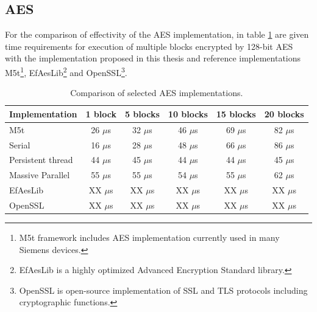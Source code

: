 \subsection*{AES}
For the comparison of effectivity of the AES implementation, in table 
\ref{aes-comparison} are given time requirements for execution of multiple
blocks encrypted by 128-bit AES with the implementation proposed in this thesis
and reference implementations M5t\footnote{ M5t framework includes AES 
implementation currently used in many Siemens devices\cite{m5t}.}, 
EfAesLib\footnote{ EfAesLib is a highly optimized Advanced Encryption Standard 
library\cite{aes-lib}.} and OpenSSL\footnote{ OpenSSL is open-source 
implementation of SSL and TLS protocols including cryptographic 
functions\cite{openssl}.}.
\begin{table}[H]
\begin{center}
\begin{tabular}{|l|ccccc|}\hline%
Implementation &  1 block & 5 blocks & 10 blocks & 15 blocks & 20 blocks\\\hline
M5t  &26 $\mu$s&32 $\mu$s&46 $\mu$s&69 $\mu$s&82 $\mu$s\\ 
Serial  &16 $\mu$s&28 $\mu$s&48 $\mu$s&66 $\mu$s&86 $\mu$s\\
Persistent thread&44 $\mu$s&45 $\mu$s&44 $\mu$s&44 $\mu$s&45 $\mu$s\\
Massive Parallel&55 $\mu$s&55 $\mu$s&54 $\mu$s&55 $\mu$s&62 $\mu$s\\
EfAesLib &XX $\mu$s&XX $\mu$s&XX $\mu$s&XX $\mu$s&XX $\mu$s\\
OpenSSL &XX $\mu$s&XX $\mu$s&XX $\mu$s&XX $\mu$s&XX $\mu$s\\\hline
\end{tabular}
\end{center}
\caption{Comparison of selected AES implementations.}
\label{aes-comparison}
\end{table}


